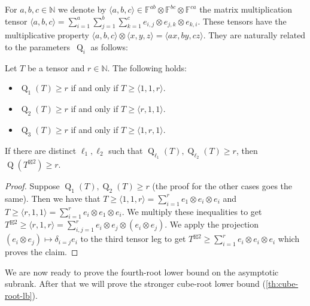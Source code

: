 \documentclass{daj}
\DeclareMathOperator{\subrank}{Q}
\newcommand{\FF}{\mathbb{F}}
\newcommand{\NN}{\mathbb{N}}
\begin{document}
For $a,b,c \in \NN$ we denote by $\langle a,b,c\rangle \in \FF^{ab} \otimes \FF^{bc} \otimes \FF^{ca}$ the %
matrix multiplication tensor $\langle a,b,c \rangle = \sum_{i=1}^a \sum_{j=1}^b \sum_{k=1}^c e_{i,j} \otimes e_{j,k} \otimes e_{k,i}$. 
These tensors have the multiplicative property $\langle a,b,c\rangle \otimes \langle x,y,z\rangle = \langle ax, by, cz\rangle$. They are naturally related to the parameters~$\subrank_i$ as follows:

\begin{lemma}\label{lem:Qi-mamu}
Let $T$ be a tensor and $r \in \NN$. The following holds:
\begin{itemize}
\item $\subrank_1(T) \geq r$ if and only if $T \geq \langle 1, 1,r \rangle$.
\item $\subrank_2(T) \geq r$ if and only if $T \geq \langle r, 1,1 \rangle$.
\item $\subrank_3(T) \geq r$ if and only if $T \geq \langle 1, r, 1 \rangle$.  
\end{itemize}
\end{lemma}

\begin{lemma}\label{lem:Qi-square}
    If there are distinct ${\ell_1},{\ell_2}$ such that $\subrank_{\ell_1}(T), \subrank_{\ell_2}(T) \geq r$, then $\subrank(T^{\boxtimes 2}) \geq r$.
\end{lemma}

\begin{proof}
Suppose $\subrank_1(T), \subrank_2(T) \geq r$ (the proof for the other cases goes the same). Then we have that
$
T \geq \langle1, 1, r\rangle =  \sum_{i=1}^r e_1 \otimes e_i \otimes e_i$ and 
$T \geq \langle r, 1, 1\rangle = \sum_{i=1}^r e_i \otimes e_1 \otimes e_i$.
%
We multiply these inequalities to get
$T^{\boxtimes 2} \geq \langle r,1,r\rangle= \sum_{i,j=1}^r e_i \otimes e_j \otimes (e_i \otimes e_j).
$
We apply the projection $(e_i \otimes e_j) \mapsto \delta_{i=j} e_i$ to the third tensor leg to get
$
T^{\boxtimes 2} \geq \sum_{i=1}^r e_i \otimes e_i \otimes e_i
$
which proves the claim.
\end{proof}

We are now ready to prove the fourth-root lower bound on the asymptotic subrank. After that we will prove the stronger cube-root lower bound (\autoref{th:cube-root-lb}).
\end{document}
